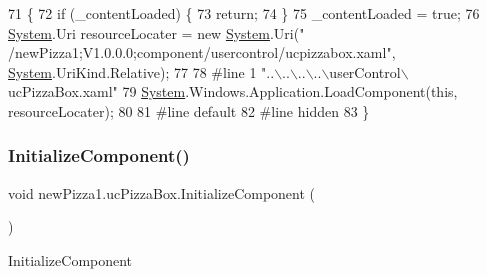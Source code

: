 \begin{DoxyCode}
71                                           \{
72             \textcolor{keywordflow}{if} (\_contentLoaded) \{
73                 \textcolor{keywordflow}{return};
74             \}
75             \_contentLoaded = \textcolor{keyword}{true};
76             \hyperlink{namespaceSystem}{System}.Uri resourceLocater = \textcolor{keyword}{new} \hyperlink{namespaceSystem}{System}.Uri(\textcolor{stringliteral}{"
      /newPizza1;V1.0.0.0;component/usercontrol/ucpizzabox.xaml"}, \hyperlink{namespaceSystem}{System}.UriKind.Relative);
77             
78 \textcolor{preprocessor}{            #line 1 "..\(\backslash\)..\(\backslash\)..\(\backslash\)..\(\backslash\)userControl\(\backslash\)ucPizzaBox.xaml"}
79             \hyperlink{namespaceSystem}{System}.Windows.Application.LoadComponent(\textcolor{keyword}{this}, resourceLocater);
80             
81 \textcolor{preprocessor}{            #line default}
82 \textcolor{preprocessor}{            #line hidden}
83         \}
\end{DoxyCode}
\mbox{\label{classnewPizza1_1_1ucPizzaBox_a0bf3486ff05489987fc9b6766aec72d1}} 
\subsubsection{\texorpdfstring{Initialize\+Component()}{InitializeComponent()}\hspace{0.1cm}{\footnotesize\ttfamily [2/6]}}
{\footnotesize\ttfamily void new\+Pizza1.\+uc\+Pizza\+Box.\+Initialize\+Component (\begin{DoxyParamCaption}{ }\end{DoxyParamCaption})\hspace{0.3cm}{\ttfamily [inline]}}



Initialize\+Component 


